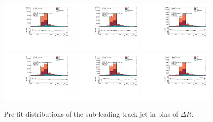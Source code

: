 \begin{figure}[htbp]
  \centering
 \includegraphics[width=0.32\textwidth]{figures/gbb/Sub_Sd0_Fits/Canv_PreFit_02-DeltaR-025_LpT_INF_SpT_INF_coarse_y.pdf}
 \includegraphics[width=0.32\textwidth]{figures/gbb/Sub_Sd0_Fits/Canv_PreFit_025-DeltaR-03_LpT_INF_SpT_INF_coarse_y.pdf}
 \includegraphics[width=0.32\textwidth]{figures/gbb/Sub_Sd0_Fits/Canv_PreFit_03-DeltaR-04_LpT_INF_SpT_INF_coarse_y.pdf}\\
 \includegraphics[width=0.32\textwidth]{figures/gbb/Sub_Sd0_Fits/Canv_PreFit_04-DeltaR-05_LpT_INF_SpT_INF_coarse_y.pdf}
 \includegraphics[width=0.32\textwidth]{figures/gbb/Sub_Sd0_Fits/Canv_PreFit_05-DeltaR-06_LpT_INF_SpT_INF_coarse_y.pdf}
 \includegraphics[width=0.32\textwidth]{figures/gbb/Sub_Sd0_Fits/Canv_PreFit_06-DeltaR-07_LpT_INF_SpT_INF_coarse_y.pdf}\\

\caption{Pre-fit \subsdzero distributions of the sub-leading track jet in bins of $\Delta R$. }
  \label{fig:dR-prefits-subleading}
\end{figure}

